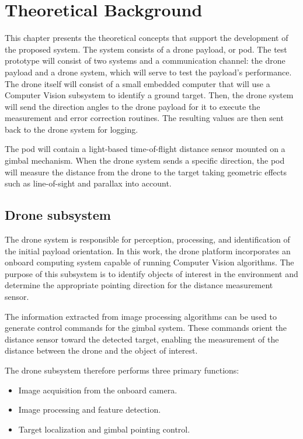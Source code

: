 
\chapter{Theoretical Background}
\label{cap:back}

This chapter presents the theoretical concepts that support the development of the proposed
system. The system consists of a drone payload, or pod. The test prototype will consist of
two systems and a communication channel: the drone payload and a drone system, which will serve
to test the payload's performance. The drone itself will consist of a small embedded computer
that will use a Computer Vision subsystem to identify a ground target. Then, the drone
system will send the direction angles to the drone payload for it to execute the measurement
and error correction routines. The resulting values are then sent back to the drone system
for logging.

The pod will contain a light-based time-of-flight distance sensor mounted on a gimbal
mechanism. When the drone system sends a specific direction, the pod will measure the
distance from the drone to the target taking  geometric effects such as line-of-sight and
parallax into account.

\section{Drone subsystem}

The drone system is responsible for perception, processing, and identification of the initial
payload orientation. In this work, the drone platform incorporates an onboard computing system
capable of running Computer Vision algorithms. The purpose of this subsystem is to identify
objects of interest in the environment and determine the appropriate pointing direction for
the distance measurement sensor.

The information extracted from image processing algorithms can be used to generate control
commands for the gimbal system. These commands orient the distance sensor toward the
detected target, enabling the measurement of the distance between the drone and the object
of interest.

The drone subsystem therefore performs three primary functions:

\begin{itemize}
  \item Image acquisition from the onboard camera.
  \item Image processing and feature detection.
  \item Target localization and gimbal pointing control.
\end{itemize}

